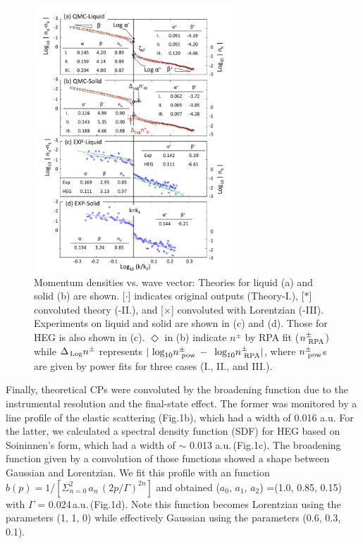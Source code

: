 \documentclass[twocolumn,showpacs,showkeys,fleqn,prl,superscriptaddress]{revtex4}%
\newcommand{\nn}[1]{\textnormal{ #1}}
\begin{document}
\begin{figure}
\includegraphics[bb= 70 10 500 700, width=7.5cm]{fig3.pdf}
\caption{Momentum densities vs. wave vector:  Theories for liquid (a) and solid (b) are shown. [$\cdot$] indicates original outputs (Theory-I.), [$*$]  convoluted theory (-II.), and [$\times$] convoluted with Lorentzian (-III).  Experiments on liquid and solid are shown in (c) and (d). Those for HEG is also shown in (c).
 $\Diamond$ in (b) indicate $n^{\pm}$ by RPA fit ($n^{\pm}_{\nn{RPA}}$)  
while $\Delta_{\!\nn{Log}} n^{\pm}$ represents $ | \nn{log}_{10} n^{\pm}_{\nn{pow}} \,-\, \nn{log}_{10} n^{\pm}_{\nn{RPA}} | $,
where $ n^{\pm}_{\nn{pow}} $s are given by power fits for three cases (I., II., and III.).
} 
\label{Fig.3}
\end{figure}

Finally, theoretical CPs were convoluted by the broadening function due to the instrumental resolution and the final-state effect. 
The former was monitored by a line profile of the elastic scattering (Fig.1b), which had a width of 0.016 a.u.
For the latter, we calculated a spectral density function (SDF) for HEG based on Soininnen's form\cite{soi01}, which had a width of $\sim$ 0.013 a.u.\,(Fig.1c).   
The broadening function given by a convolution of those functions showed a shape between Gaussian and Lorentzian.
We fit this profile with an function $b(p) =1/ [ \Sigma_{n=0}^{2}\,a_n\,(2p / \Gamma )^{2n} ]$ and obtained ($a_0$, $a_1$, $a_2$) =(1.0, 0.85, 0.15) with $\Gamma$ = 0.024\,a.u.\,(Fig.1d).
Note this function becomes Lorentzian using the parameters (1, 1, 0) while effectively Gaussian using the parameters (0.6, 0.3, 0.1). %
\end{document}
